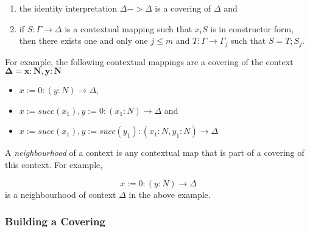 \begin{enumerate}
  \item the identity interpretation $\Delta -> \Delta$ is a covering of $\Delta$ and
  \item if $S : \Gamma \to \Delta$ is a contextual mapping such that $x_iS$ is in constructor form, then there exists one and only one $j \leq m$ and $T : \Gamma \to \Gamma_j$ such that $S = T;S_j$. 
\end{enumerate}

For example, the following contextual mappings are a covering of the context $\boldsymbol{\Delta = x : N, y : N}$

\begin{itemize}
  \item ${x := 0} : (y : N) \to \Delta$,
  \item ${x := succ(x_1), y:= 0} : (x_1 : N) \to \Delta$ and
  \item ${x := succ(x_1), y:= succ(y_1)} : (x_1 : N, y_1 : N) \to \Delta$
\end{itemize}

A \textit{neighbourhood} of a context is any contextual map that is part of a covering of this context. For example, 

\[
  {x := 0} : (y : N) \to \Delta
\] is a neighbourhood of context $\Delta$ in the above example.

\subsubsection{Building a Covering}



